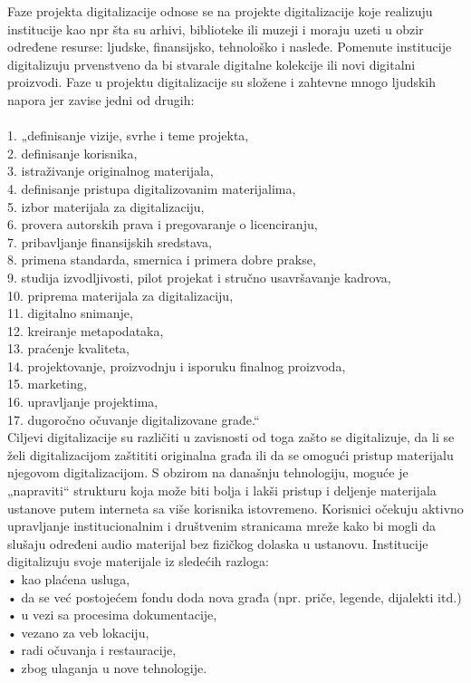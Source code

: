 \documentclass[11pt]{article}
\begin{document}
        Faze projekta digitalizacije odnose se na projekte digitalizacije koje realizuju institucije kao npr šta su arhivi, biblioteke ili muzeji i moraju uzeti u obzir određene resurse: ljudske, finansijsko, tehnološko i nasleđe. Pomenute institucije digitalizuju prvenstveno da bi stvarale digitalne kolekcije ili novi digitalni proizvodi. Faze u projektu digitalizacije su složene i zahtevne mnogo ljudskih napora jer zavise jedni od drugih: \\\\
        1. „definisanje vizije, svrhe i teme projekta,\\
        2. definisanje korisnika,\\
        3. istraživanje originalnog materijala,\\
        4. definisanje pristupa digitalizovanim materijalima,\\
        5. izbor materijala za digitalizaciju,\\
        6. provera autorskih prava i pregovaranje o licenciranju,\\
        7. pribavljanje finansijskih sredstava,\\
        8. primena standarda, smernica i primera dobre prakse,\\
        9. studija izvodljivosti, pilot projekat i stručno usavršavanje kadrova,\\
        10. priprema materijala za digitalizaciju,\\
        11. digitalno snimanje,\\
        12. kreiranje metapodataka,\\
        13. praćenje kvaliteta,\\
        14. projektovanje, proizvodnju i isporuku finalnog proizvoda,\\
        15. marketing,\\
        16. upravljanje projektima,\\
        17. dugoročno očuvanje digitalizovane građe.“ \\
        
Ciljevi digitalizacije su različiti u zavisnosti od toga zašto se digitalizuje, da li se želi
digitalizacijom zaštititi originalna građa ili da se omogući pristup materijalu njegovom digitalizacijom.
S obzirom na današnju tehnologiju, moguće je „napraviti“ strukturu koja može biti bolja i
lakši pristup i deljenje materijala ustanove putem interneta sa više korisnika istovremeno. Korisnici očekuju aktivno upravljanje institucionalnim i društvenim stranicama mreže kako bi mogli da slušaju određeni audio materijal bez fizičkog dolaska u ustanovu.
Institucije digitalizuju svoje materijale iz sledećih razloga: \\
• kao plaćena usluga, \\
• da se već postojećem fondu doda nova građa (npr. priče, legende, dijalekti itd.) \\
• u vezi sa procesima dokumentacije, \\
• vezano za veb lokaciju, \\
• radi očuvanja i restauracije,  \\
• zbog ulaganja u nove tehnologije. \\
\end{document}

